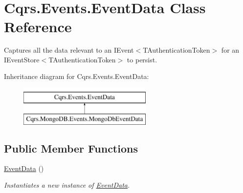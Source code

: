 \hypertarget{classCqrs_1_1Events_1_1EventData}{}\section{Cqrs.\+Events.\+Event\+Data Class Reference}
\label{classCqrs_1_1Events_1_1EventData}


Captures all the data relevant to an I\+Event$<$\+T\+Authentication\+Token$>$ for an I\+Event\+Store$<$\+T\+Authentication\+Token$>$ to persist.  


Inheritance diagram for Cqrs.\+Events.\+Event\+Data\+:\begin{figure}[H]
\begin{center}
\leavevmode
\includegraphics[height=2.000000cm]{classCqrs_1_1Events_1_1EventData}
\end{center}
\end{figure}
\subsection*{Public Member Functions}
\begin{DoxyCompactItemize}
\item 
\hyperlink{classCqrs_1_1Events_1_1EventData_a0387ea22e5cdc085caf113a82f5ace18_a0387ea22e5cdc085caf113a82f5ace18}{Event\+Data} ()
\begin{DoxyCompactList}\small\item\em Instantiates a new instance of \hyperlink{classCqrs_1_1Events_1_1EventData}{Event\+Data}. \end{DoxyCompactList}\end{DoxyCompactItemize}

